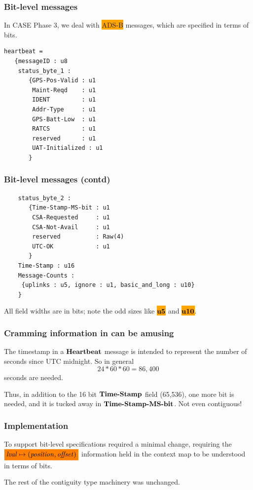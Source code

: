 \documentclass{beamer}
\newcommand{\kemph}[1]{\colorbox{orange}{#1}}
\newcommand{\highlight}[2][orange]{\mathchoice%
  {\colorbox{#1}{$\displaystyle#2$}}%
  {\colorbox{#1}{$\textstyle#2$}}%
  {\colorbox{#1}{$\scriptstyle#2$}}%
  {\colorbox{#1}{$\scriptscriptstyle#2$}}}%
\newcommand{\konst}[1]{\ensuremath{\mbox{\bf{#1}}}}
\begin{document}
\begin{frame}[fragile]\frametitle{Bit-level messages}

In CASE Phase 3, we deal with \kemph{ADS-B} messages, which are
specified in terms of bits.

{\small
\begin{verbatim}
heartbeat =
   {messageID : u8
    status_byte_1 :
       {GPS-Pos-Valid : u1
        Maint-Reqd    : u1
        IDENT         : u1
        Addr-Type     : u1
        GPS-Batt-Low  : u1
        RATCS         : u1
        reserved      : u1
        UAT-Initialized : u1
       }
\end{verbatim}
}

\end{frame}

\begin{frame}[fragile]\frametitle{Bit-level messages (contd)}

{\small
\begin{verbatim}
    status_byte_2 :
       {Time-Stamp-MS-bit : u1
        CSA-Requested     : u1
        CSA-Not-Avail     : u1
        reserved          : Raw(4)
        UTC-OK            : u1
       }
    Time-Stamp : u16
    Message-Counts :
     {uplinks : u5, ignore : u1, basic_and_long : u10}
    }
\end{verbatim}}

All field widths are in bits; note the odd sizes like
\kemph{\konst{u5}} and \kemph{\konst{u10}}.

\end{frame}

\begin{frame} \frametitle{Cramming information in can be amusing}

  The timestamp in a \konst{Heartbeat} message is intended to
  represent the number of seconds since UTC midnight.  So in general
\[ 24 * 60 * 60 = 86,400\]
seconds are needed.

Thus, in addition to the 16 bit \konst{Time-Stamp} field (65,536), one
more bit is needed, and it is tucked away in
\konst{Time-Stamp-MS-bit}. Not even contiguous!

\end{frame}

\begin{frame}\frametitle{Implementation}

  To support bit-level specifications required a minimal change,
  requiring the $\highlight{\mathit{lval} \mapsto
    (\mathit{position},\mathit{offset})}$ information held in the
  context map to be understood in terms of bits.

  The rest of the contiguity type machinery was unchanged.

\end{frame}
\end{document}
